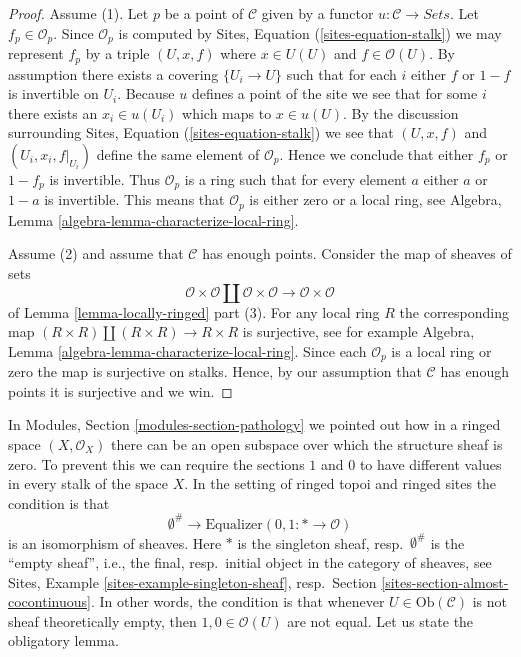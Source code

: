 \begin{proof}
Assume (1). Let $p$ be a point of $\mathcal{C}$ given by a functor
$u : \mathcal{C} \to \textit{Sets}$. Let
$f_p \in \mathcal{O}_p$. Since $\mathcal{O}_p$ is computed by
Sites, Equation (\ref{sites-equation-stalk})
we may represent $f_p$ by a triple
$(U, x, f)$ where $x \in U(U)$ and $f \in \mathcal{O}(U)$.
By assumption there exists a covering $\{U_i \to U\}$
such that for each $i$ either $f$ or $1 - f$ is invertible
on $U_i$. Because $u$ defines a point of the site we see that
for some $i$ there exists an $x_i \in u(U_i)$ which maps to
$x \in u(U)$. By the discussion surrounding
Sites, Equation (\ref{sites-equation-stalk})
we see that $(U, x, f)$ and $(U_i, x_i, f|_{U_i})$ define the
same element of $\mathcal{O}_p$. Hence we conclude that
either $f_p$ or $1 - f_p$ is invertible. Thus
$\mathcal{O}_p$ is a ring such that for every element $a$
either $a$ or $1 - a$ is invertible. This means that $\mathcal{O}_p$
is either zero or a local ring, see
Algebra, Lemma \ref{algebra-lemma-characterize-local-ring}.

\medskip\noindent
Assume (2) and assume that $\mathcal{C}$ has enough points.
Consider the map of sheaves of sets
$$
\mathcal{O} \times \mathcal{O} \amalg \mathcal{O} \times \mathcal{O}
\longrightarrow
\mathcal{O} \times \mathcal{O}
$$
of
Lemma \ref{lemma-locally-ringed} part (3). For any local ring $R$
the corresponding map
$(R \times R) \amalg (R \times R) \to R \times R$
is surjective, see for example
Algebra, Lemma \ref{algebra-lemma-characterize-local-ring}.
Since each $\mathcal{O}_p$ is a local ring or zero the map is
surjective on stalks. Hence, by our assumption that $\mathcal{C}$
has enough points it is surjective and we win.
\end{proof}

\noindent
In
Modules, Section \ref{modules-section-pathology}
we pointed out how in a ringed space $(X, \mathcal{O}_X)$
there can be an open subspace over which the structure sheaf is zero.
To prevent this we can require the sections $1$ and $0$ to have different
values in every stalk of the space $X$. In the setting of ringed topoi
and ringed sites the condition is that
\begin{equation}
\label{equation-one-is-never-zero}
\emptyset^\# \longrightarrow
\text{Equalizer}(0, 1 : * \longrightarrow \mathcal{O})
\end{equation}
is an isomorphism of sheaves. Here $*$ is the singleton sheaf,
resp.\ $\emptyset^\#$ is the ``empty sheaf'',
i.e., the final, resp.\ initial object in the category of sheaves, see
Sites, Example \ref{sites-example-singleton-sheaf},
resp.\ Section \ref{sites-section-almost-cocontinuous}.
In other words, the condition is that whenever $U \in \text{Ob}(\mathcal{C})$
is not sheaf theoretically empty, then $1, 0 \in \mathcal{O}(U)$ are not
equal. Let us state the obligatory lemma.


